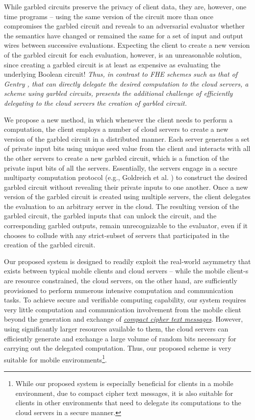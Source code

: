 \documentclass[10pt,journal,cspaper,compsoc]{IEEEtran}
\begin{document}
While garbled circuits preserve the privacy of client data, they are, however, one time programs -- using the same version of the circuit more than once compromises the garbled circuit and reveals to an adversarial evaluator whether the semantics have changed or remained the same for a set of input and output wires between successive evaluations. Expecting the client to create a new version of the garbled circuit for each evaluation, however, is an unreasonable solution, since creating a garbled circuit is at least as expensive as evaluating the underlying Boolean circuit! {\em Thus, in contrast to FHE schemes such as that of Gentry \cite{gentry10}, that can directly delegate the desired computation to the cloud servers, a scheme using garbled circuits, presents the additional challenge of efficiently delegating to the cloud servers the creation of garbled circuit.}


We propose a new method, in which whenever the client needs to perform a computation, the client employs a number of cloud servers to create a new version of the garbled circuit in a distributed manner. Each server generates a set of private input bits using unique seed value from the client and interacts with all the other servers to create a new garbled circuit, which is a function of the private input bits of all the servers. Essentially, the servers engage in a secure multiparty computation protocol (e.g., Goldreich et al. \cite{goldreich04,goldreich87}) to construct the desired garbled circuit without revealing their private inputs to one another. Once a new version of the garbled circuit is created using multiple servers, the client delegates the evaluation to an arbitrary server in the cloud. The resulting version of the garbled circuit, the garbled inputs that can unlock the circuit, and the corresponding garbled outputs, remain unrecognizable to the evaluator, even if it chooses to collude with any strict-subset of servers that participated in the creation of the garbled circuit.


Our proposed system is designed to readily exploit the real-world asymmetry that exists between typical mobile clients and cloud servers -- while the mobile client-s are resource constrained, the cloud servers, on the other hand, are sufficiently provisioned to perform numerous intensive computation and communication tasks. To achieve secure and verifiable computing capability, our system requires very little computation and communication involvement from the mobile client beyond the generation and exchange of \underline{\em compact cipher text messages}. However, using significantly larger resources available to them, the cloud servers can efficiently generate and exchange a large volume of random bits necessary for carrying out the delegated computation. Thus, our proposed scheme is very suitable for mobile environments\footnote{While our proposed system is especially beneficial for clients in a mobile environment, due to compact cipher text messages, it is also suitable for clients in other environments that need to delegate its computations to the cloud servers in a secure manner.}.
\end{document}
